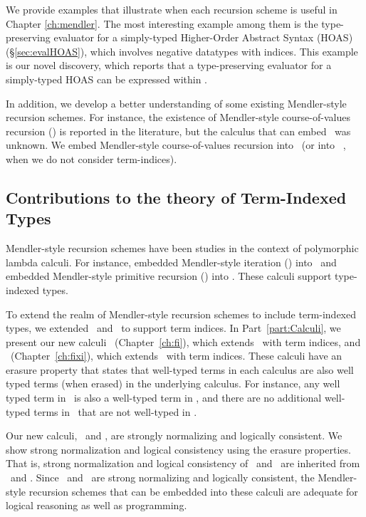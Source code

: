 We provide examples that illustrate when each recursion scheme is useful
in Chapter \ref{ch:mendler}. The most interesting example among them is
the type-preserving evaluator for a simply-typed Higher-Order Abstract Syntax
(HOAS) (\S\ref{sec:evalHOAS}), which involves negative datatypes with indices.
This example is our novel discovery, which reports that
a type-preserving evaluator for a simply-typed HOAS can be expressed within \Fw.

In addition, we develop a better understanding of some existing
Mendler-style recursion schemes. For instance, the existence of
Mendler-style course-of-values recursion (\McvPr) is reported
in the literature, but the calculus that can embed \McvPr\ was unknown.
We embed Mendler-style course-of-values recursion into \Fixi\ 
(or into \Fixw\ \cite{AbeMat04}, when we do not consider term-indices).

\subsection{Contributions to the theory of Term-Indexed Types}
Mendler-style recursion schemes have been studies in the context of
polymorphic lambda calculi. For instance, \citet{AbeMatUus03} embedded 
Mendler-style iteration (\MIt) into \Fw\ and \citet{AbeMat04} embedded
Mendler-style primitive recursion (\MPr) into \Fixw. These calculi
support type-indexed types.

To extend the realm of Mendler-style recursion schemes to include
term-indexed types, we extended \Fw\ and \Fixw\ to support term indices.
In Part~\ref{part:Calculi}, we present our new calculi
\Fi\ (Chapter~\ref{ch:fi}), which extends \Fw\ with term indices, and
\Fixi\ (Chapter~\ref{ch:fixi}), which extends \Fixw\ with term indices.
These calculi have an erasure property that states that well-typed terms
in each calculus are also well typed terms (when erased) in the 
underlying calculus. For instance, any well typed term in \Fi\ is also
a well-typed term in \Fw, and there are no additional well-typed terms
in \Fi\ that are not well-typed in \Fw.

Our new calculi, \Fi\ and \Fixi, are strongly normalizing and
logically consistent. We show strong normalization and logical consistency
using the erasure properties. That is, strong normalization and
logical consistency of \Fi\ and \Fixi\ are inherited from \Fw\ and \Fixw.
Since \Fi\ and \Fixi\ are strong normalizing and logically  consistent,
the Mendler-style recursion schemes that can be embedded into these calculi
are adequate for logical reasoning as well as programming.

